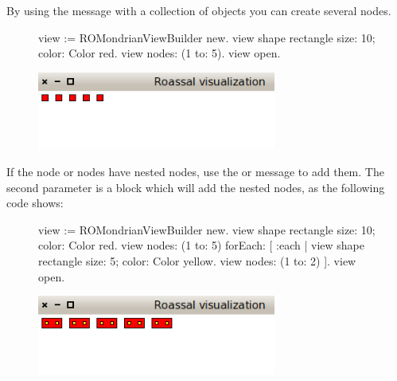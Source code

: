 \documentclass[a4paper,10pt,twoside]{book}
\begin{document}
By using the  message with a collection of objects you can create several nodes.

\begin{figure}[H]
      \begin{minipage}[t]{1\textwidth}
      \vspace{0pt}
\begin{code}{}
view := ROMondrianViewBuilder new.
view shape rectangle 
	size: 10;
	color: Color red.
view nodes: (1 to: 5).
view open.
\end{code}
   \end{minipage}
   \hfill
   \begin{minipage}[t]{1\textwidth}
	 \vspace{0pt} \raggedright
       \centering
		\includegraphics[width=0.7\textwidth]{mondrian3}
   \end{minipage}
\label{fig:mondrian3}
\end{figure} 

If the node or nodes have nested nodes, use the  or  message to add them. The second parameter is a block which will add the nested nodes, as the following code shows:

\begin{figure}[H]
      \begin{minipage}[t]{1\textwidth}
      \vspace{0pt}
\begin{code}{}
view := ROMondrianViewBuilder new.
view shape rectangle 
	size: 10;
	color: Color red.
view 
	nodes: (1 to: 5) 	
	forEach: [ :each |
		view shape rectangle 
			size: 5;
			color: Color yellow.
		view nodes: (1 to: 2) ].
view open.
\end{code}
   \end{minipage}
   \hfill
   \begin{minipage}[t]{1\textwidth}
	 \vspace{0pt} \raggedright
       \centering
		\includegraphics[width=0.7\textwidth]{mondrian4}
   \end{minipage}
\label{fig:mondrian4}
\end{figure} 
\end{document}
